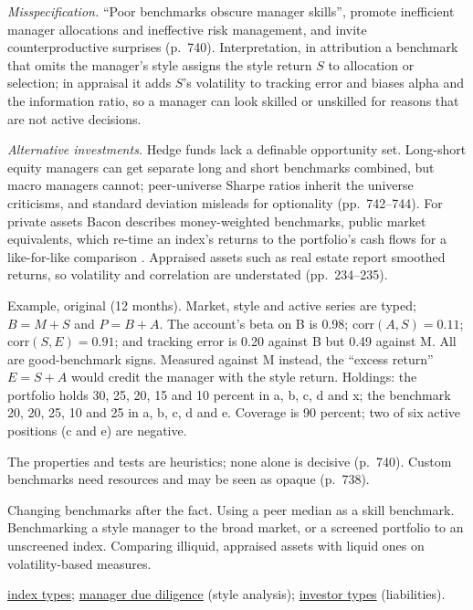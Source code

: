 \begin{qfmethod}
\emph{Misspecification.} ``Poor benchmarks obscure manager skills'', promote inefficient manager allocations and ineffective risk management, and invite counterproductive surprises (p.~740). Interpretation, in attribution a benchmark that omits the manager's style assigns the style return $S$ to allocation or selection; in appraisal it adds $S$'s volatility to tracking error and biases alpha and the information ratio, so a manager can look skilled or unskilled for reasons that are not active decisions.

\emph{Alternative investments.} Hedge funds lack a definable opportunity set. Long-short equity managers can get separate long and short benchmarks combined, but macro managers cannot; peer-universe Sharpe ratios inherit the universe criticisms, and standard deviation misleads for optionality (pp.~742--744). For private assets Bacon describes money-weighted benchmarks, public market equivalents, which re-time an index's returns to the portfolio's cash flows for a like-for-like comparison \citep[3rd ed., 2023, chap.~4, p.~125]{wide-bacon-attribution}. Appraised assets such as real estate report smoothed returns, so volatility and correlation are understated (pp.~234--235).

 Example, original (12 months). Market, style and active series are typed; $B=M+S$ and $P=B+A$. The account's beta on B is 0.98; corr$(A,S)=0.11$; corr$(S,E)=0.91$; and tracking error is 0.20 against B but 0.49 against M. All are good-benchmark signs. Measured against M instead, the ``excess return'' $E=S+A$ would credit the manager with the style return. Holdings: the portfolio holds 30, 25, 20, 15 and 10 percent in a, b, c, d and x; the benchmark 20, 20, 25, 10 and 25 in a, b, c, d and e. Coverage is 90 percent; two of six active positions (c and e) are negative.

 The properties and tests are heuristics; none alone is decisive (p.~740). Custom benchmarks need resources and may be seen as opaque (p.~738).

 Changing benchmarks after the fact. Using a peer median as a skill benchmark. Benchmarking a style manager to the broad market, or a screened portfolio to an unscreened index. Comparing illiquid, appraised assets with liquid ones on volatility-based measures.

 \hyperref[def:equity-fixed-income-index-types]{index types}; \hyperref[meth:manager-due-diligence]{manager due diligence} (style analysis); \hyperref[def:investor-types-needs]{investor types} (liabilities).

\end{qfmethod}

